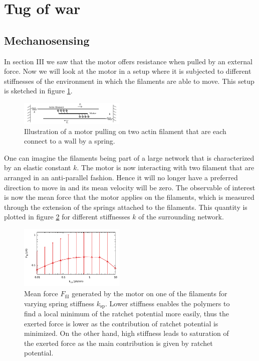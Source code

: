 \documentclass[aps,pre,twocolumn,showpacs,showkeys]{revtex4-1}
\begin{document}
\section{Tug of war}
\label{sec:tug}
\subsection{Mechanosensing}
In  section III we saw that the motor offers resistance when pulled by an external force. 
Now we will look at the motor in a setup where it is subjected to different stiffnesses of the environment in which the filaments are able to move. 
This setup is sketched in figure \ref{Fig: tug}. 
\begin{figure}[t]
\centering
\includegraphics[width=0.45\textwidth,height=!]{tug}
\caption{Illustration of a motor pulling on two actin filament that are each connect to a wall by a spring.}
\label{Fig: tug}
\end{figure}
One can imagine the filaments being part of a large network that is characterized by an elastic constant $k$. 
The motor is now interacting with two filament that are arranged in an anti-parallel fashion. 
Hence it will no longer have a preferred direction to move in and its mean velocity will be zero. 
The observable of interest is now the mean force that the motor applies on the filaments, which is measured through the extension of the springs attached to the filaments. 
This quantity is plotted in figure \ref{Fig: tug_k} for different stiffnesses $k$ of the surrounding network.
\begin{figure}[t]
\centering
\includegraphics[width=0.45\textwidth,height=!]{tug_k}
\caption{Mean force $F_\text{fil}$ generated by the motor on one of the filaments for varying spring stiffness $k_\text{sp}$.
Lower stiffness enables the polymers to find a local minimum of the ratchet potential more easily, 
thus the exerted force is lower as the contribution of ratchet potential is minimized. 
On the other hand, high stiffness leads to saturation of the exerted force as the main contribution is given by ratchet potential. 
}
\label{Fig: tug_k}
\end{figure}
\end{document}
